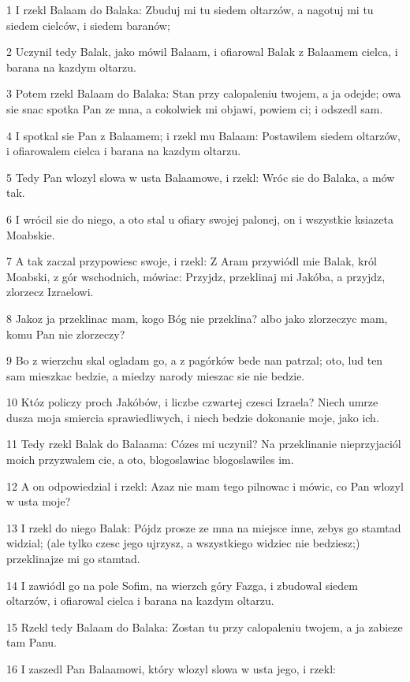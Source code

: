 \par 1 I rzekl Balaam do Balaka: Zbuduj mi tu siedem oltarzów, a nagotuj mi tu siedem cielców, i siedem baranów;
\par 2 Uczynil tedy Balak, jako mówil Balaam, i ofiarowal Balak z Balaamem cielca, i barana na kazdym oltarzu.
\par 3 Potem rzekl Balaam do Balaka: Stan przy calopaleniu twojem, a ja odejde; owa sie snac spotka Pan ze mna, a cokolwiek mi objawi, powiem ci; i odszedl sam.
\par 4 I spotkal sie Pan z Balaamem; i rzekl mu Balaam: Postawilem siedem oltarzów, i ofiarowalem cielca i barana na kazdym oltarzu.
\par 5 Tedy Pan wlozyl slowa w usta Balaamowe, i rzekl: Wróc sie do Balaka, a mów tak.
\par 6 I wrócil sie do niego, a oto stal u ofiary swojej palonej, on i wszystkie ksiazeta Moabskie.
\par 7 A tak zaczal przypowiesc swoje, i rzekl: Z Aram przywiódl mie Balak, król Moabski, z gór wschodnich, mówiac: Przyjdz, przeklinaj mi Jakóba, a przyjdz, zlorzecz Izraelowi.
\par 8 Jakoz ja przeklinac mam, kogo Bóg nie przeklina? albo jako zlorzeczyc mam, komu Pan nie zlorzeczy?
\par 9 Bo z wierzchu skal ogladam go, a z pagórków bede nan patrzal; oto, lud ten sam mieszkac bedzie, a miedzy narody mieszac sie nie bedzie.
\par 10 Któz policzy proch Jakóbów, i liczbe czwartej czesci Izraela? Niech umrze dusza moja smiercia sprawiedliwych, i niech bedzie dokonanie moje, jako ich.
\par 11 Tedy rzekl Balak do Balaama: Cózes mi uczynil? Na przeklinanie nieprzyjaciól moich przyzwalem cie, a oto, blogoslawiac blogoslawiles im.
\par 12 A on odpowiedzial i rzekl: Azaz nie mam tego pilnowac i mówic, co Pan wlozyl w usta moje?
\par 13 I rzekl do niego Balak: Pójdz prosze ze mna na miejsce inne, zebys go stamtad widzial; (ale tylko czesc jego ujrzysz, a wszystkiego widziec nie bedziesz;) przeklinajze mi go stamtad.
\par 14 I zawiódl go na pole Sofim, na wierzch góry Fazga, i zbudowal siedem oltarzów, i ofiarowal cielca i barana na kazdym oltarzu.
\par 15 Rzekl tedy Balaam do Balaka: Zostan tu przy calopaleniu twojem, a ja zabieze tam Panu.
\par 16 I zaszedl Pan Balaamowi, który wlozyl slowa w usta jego, i rzekl:
